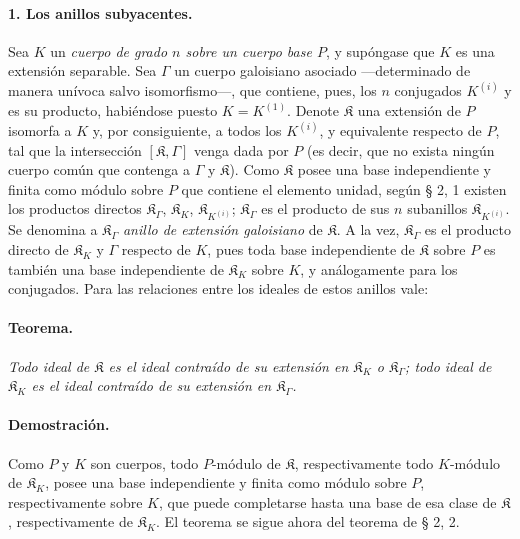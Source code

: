 \paragraph{1. Los anillos subyacentes.}
Sea $K$ un \emph{cuerpo de grado $n$ sobre un cuerpo base $P$}, y supóngase que $K$ es una extensión separable. Sea $\Gamma$ un cuerpo galoisiano asociado ---determinado de manera unívoca salvo isomorfismo---, que contiene, pues, los $n$ conjugados $K^{(i)}$ y es su producto, habiéndose puesto $K=K^{(1)}$. Denote $\mathfrak K$ una extensión de $P$ isomorfa a $K$ y, por consiguiente, a todos los $K^{(i)}$, y equivalente respecto de $P$, tal que la intersección $[\mathfrak K,\Gamma]$ venga dada por $P$ (es decir, que no exista ningún cuerpo común que contenga a $\Gamma$ y $\mathfrak K$). Como $\mathfrak K$ posee una base independiente y finita como módulo sobre $P$ que contiene el elemento unidad, según § 2, 1 existen los productos directos $\mathfrak K_\Gamma$, $\mathfrak K_K$, $\mathfrak K_{K^{(i)}}$; $\mathfrak K_\Gamma$ es el producto de sus $n$ subanillos $\mathfrak K_{K^{(i)}}$. Se denomina a $\mathfrak K_\Gamma$ \emph{anillo de extensión galoisiano} de $\mathfrak K$. A la vez, $\mathfrak K_\Gamma$ es el producto directo de $\mathfrak K_K$ y $\Gamma$ respecto de $K$, pues toda base independiente de $\mathfrak K$ sobre $P$ es también una base independiente de $\mathfrak K_K$ sobre $K$, y análogamente para los conjugados. Para las relaciones entre los ideales de estos anillos vale:

\paragraph{Teorema.}
\emph{Todo ideal de $\mathfrak K$ es el ideal contraído de su extensión en $\mathfrak K_K$ o $\mathfrak K_\Gamma$; todo ideal de $\mathfrak K_K$ es el ideal contraído de su extensión en $\mathfrak K_\Gamma$.}

\paragraph{Demostración.}
Como $P$ y $K$ son cuerpos, todo $P$-módulo de $\mathfrak K$, respectivamente todo $K$-módulo de $\mathfrak K_K$, posee una base independiente y finita como módulo sobre $P$, respectivamente sobre $K$, que puede completarse hasta una base de esa clase de $\mathfrak K$, respectivamente de $\mathfrak K_K$. El teorema se sigue ahora del teorema de § 2, 2.


